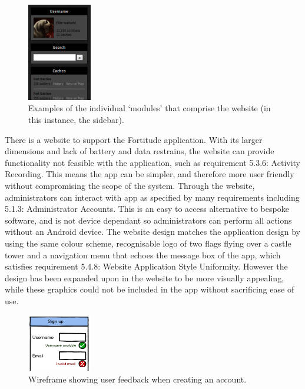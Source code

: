 \begin{figure}
	\vspace{-15pt}
	\begin{center}
	\includegraphics[width=0.25\textwidth]{images/sidebar_modules}
	\caption{Examples of the individual `modules' that comprise the website (in this instance, the sidebar).}
	\label{sidebar_modules}
	\end{center}
	\vspace{20pt}
\end{figure}

There is a website to support the Fortitude application. With its larger dimensions and lack of battery and data restrains, the website can provide functionality not feasible with the application, such as requirement 5.3.6: Activity Recording. This means the app can be simpler, and therefore more user friendly without compromising the scope of the system.
Through the website, administrators can interact with app as specified by many requirements including 5.1.3: Administrator Accounts. This is an easy to access alternative to bespoke software, and is not device dependant so administrators can perform all actions without an Android device.
The website design matches the application design by using the same colour scheme, recognisable logo of two flags flying over a castle tower and a navigation menu that echoes the message box of the app, which satisfies requirement 5.4.8: Website Application Style Uniformity. However the design has been expanded upon in the website to be more visually appealing, while these graphics could not be included in the app without sacrificing ease of use.

\begin{figure}
	\vspace{-20pt}
	\begin{center}
	\includegraphics[width=0.25\textwidth]{images/sign_up_wireframe}
	\caption{Wireframe showing user feedback when creating an account.}
	\label{sign_up_wireframe}
	\end{center}
	\vspace{-50pt}
\end{figure}

